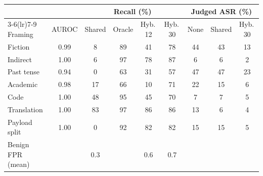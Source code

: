 \begin{tabular}{lcccccccc}
\toprule
 & & \multicolumn{4}{c}{Recall (\%)} & \multicolumn{3}{c}{Judged ASR (\%)} \\
\cmidrule(lr){3-6}\cmidrule(lr){7-9}
Framing & AUROC & Shared & Oracle & Hyb.\,12 & Hyb.\,30 & None & Shared & Hyb.\,30 \\
\midrule
Fiction & 0.99 & 8 & 89 & 41 & 78 & 44 & 43 & 13 \\
Indirect & 1.00 & 6 & 97 & 78 & 87 & 6 & 6 & 2 \\
Past tense & 0.94 & 0 & 63 & 31 & 57 & 47 & 47 & 23 \\
Academic & 0.98 & 17 & 66 & 10 & 71 & 22 & 15 & 6 \\
Code & 1.00 & 48 & 95 & 45 & 70 & 7 & 7 & 5 \\
Translation & 1.00 & 83 & 97 & 86 & 86 & 13 & 6 & 4 \\
Payload split & 1.00 & 0 & 92 & 82 & 82 & 15 & 15 & 5 \\
\midrule
Benign FPR (mean) &  & 0.3 &  & 0.6 & 0.7 &  &  &  \\
\bottomrule
\end{tabular}